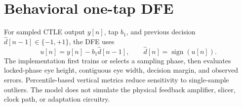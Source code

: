 \section{Behavioral one-tap DFE}

For sampled CTLE output $y[n]$, tap $b_1$, and previous decision
$\hat d[n-1]\in\{-1,+1\}$, the DFE uses
\begin{equation}
  u[n] = y[n] - b_1\hat d[n-1], \qquad
  \hat d[n] = \operatorname{sign}(u[n]).
\end{equation}
The implementation first trains or selects a sampling phase, then evaluates
locked-phase eye height, contiguous eye width, decision margin, and observed
errors. Percentile-based vertical metrics reduce sensitivity to single-sample
outliers. The model does not simulate the physical feedback amplifier, slicer,
clock path, or adaptation circuitry.
